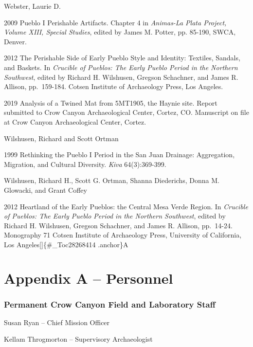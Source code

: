 \documentclass[
  12pt,
]{krantz}
\begin{document}
Webster, Laurie D.

2009 Pueblo I Perishable Artifacts. Chapter 4 in \emph{Animas-La Plata
Project, Volume XIII, Special Studies}, edited by James M. Potter, pp.
85-190, SWCA, Denver.

2012 The Perishable Side of Early Pueblo Style and Identity: Textiles,
Sandals, and Baskets. In \emph{Crucible of Pueblos: The Early Pueblo Period
in the Northern Southwest}, edited by Richard H. Wilshusen, Gregson
Schachner, and James R. Allison, pp.~159-184. Cotsen Institute of
Archaeology Press, Los Angeles.

2019 Analysis of a Twined Mat from 5MT1905, the Haynie site. Report
submitted to Crow Canyon Archaeological Center, Cortez, CO. Manuscript
on file at Crow Canyon Archaeological Center, Cortez.

Wilshusen, Richard and Scott Ortman

1999 Rethinking the Pueblo I Period in the San Juan Drainage:
Aggregation, Migration, and Cultural Diversity. \emph{Kiva} 64(3):369-399.

Wilshusen, Richard H., Scott G. Ortman, Shanna Diederichs, Donna M.
Glowacki, and Grant Coffey

2012 Heartland of the Early Pueblos: the Central Mesa Verde Region. In
\emph{Crucible of Pueblos: The Early Pueblo Period in the Northern
Southwest}, edited by Richard H. Wilshusen, Gregson Schachner, and James
R. Allison, pp.~14-24. Monography 71 Cotsen Institute of Archaeology
Press, University of California, Los Angeles{[}{]}\{\#\_Toc28268414 .anchor\}A

\backmatter

\hypertarget{appendix-a-personnel}{%
\chapter{Appendix A -- Personnel}\label{appendix-a-personnel}}

\hypertarget{permanent-crow-canyon-field-and-laboratory-staff}{%
\subsection*{Permanent Crow Canyon Field and Laboratory Staff}\label{permanent-crow-canyon-field-and-laboratory-staff}}

Susan Ryan -- Chief Mission Officer

Kellam Throgmorton -- Supervisory Archaeologist
\end{document}
